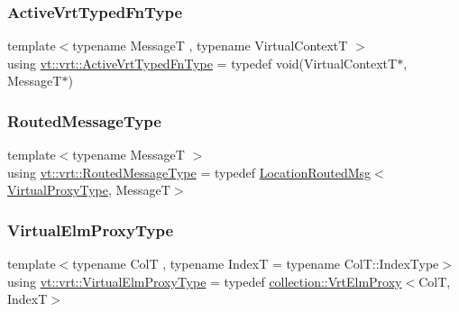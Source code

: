 \mbox{\label{namespacevt_1_1vrt_aaa8f742abd5e7ce91ecceb0957e022a5}} 
\subsubsection{\texorpdfstring{Active\+Vrt\+Typed\+Fn\+Type}{ActiveVrtTypedFnType}}
{\footnotesize\ttfamily template$<$typename MessageT , typename Virtual\+ContextT $>$ \\
using \hyperlink{namespacevt_1_1vrt_aaa8f742abd5e7ce91ecceb0957e022a5}{vt\+::vrt\+::\+Active\+Vrt\+Typed\+Fn\+Type} = typedef void(Virtual\+ContextT$\ast$, MessageT$\ast$)}

\mbox{\label{namespacevt_1_1vrt_a00a8c6e49603fd62cd0a3fbd99277e36}} 
\subsubsection{\texorpdfstring{Routed\+Message\+Type}{RoutedMessageType}}
{\footnotesize\ttfamily template$<$typename MessageT $>$ \\
using \hyperlink{namespacevt_1_1vrt_a00a8c6e49603fd62cd0a3fbd99277e36}{vt\+::vrt\+::\+Routed\+Message\+Type} = typedef \hyperlink{namespacevt_a0cb65f2151629893480ef391def4e733}{Location\+Routed\+Msg}$<$\hyperlink{namespacevt_a1b417dd5d684f045bb58a0ede70045ac}{Virtual\+Proxy\+Type}, MessageT$>$}

\mbox{\label{namespacevt_1_1vrt_a620a5c8c59d13e513f690c74b4af516f}} 
\subsubsection{\texorpdfstring{Virtual\+Elm\+Proxy\+Type}{VirtualElmProxyType}}
{\footnotesize\ttfamily template$<$typename ColT , typename IndexT  = typename Col\+T\+::\+Index\+Type$>$ \\
using \hyperlink{namespacevt_1_1vrt_a620a5c8c59d13e513f690c74b4af516f}{vt\+::vrt\+::\+Virtual\+Elm\+Proxy\+Type} = typedef \hyperlink{structvt_1_1vrt_1_1collection_1_1_vrt_elm_proxy}{collection\+::\+Vrt\+Elm\+Proxy}$<$ColT, IndexT$>$}


